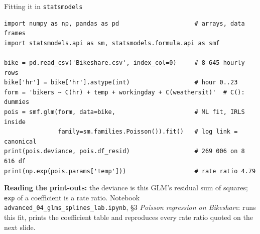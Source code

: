 \documentclass[aspectratio=169,11pt]{beamer}
\begin{document}
\begin{frame}[fragile]{Fitting it in \texttt{statsmodels}}
\begin{lstlisting}
import numpy as np, pandas as pd                     # arrays, data frames
import statsmodels.api as sm, statsmodels.formula.api as smf

bike = pd.read_csv('Bikeshare.csv', index_col=0)     # 8 645 hourly rows
bike['hr'] = bike['hr'].astype(int)                  # hour 0..23
form = 'bikers ~ C(hr) + temp + workingday + C(weathersit)'  # C(): dummies
pois = smf.glm(form, data=bike,                      # ML fit, IRLS inside
               family=sm.families.Poisson()).fit()   # log link = canonical
print(pois.deviance, pois.df_resid)                  # 269 006 on 8 616 df
print(np.exp(pois.params['temp']))                   # rate ratio 4.79
\end{lstlisting}
  \begin{labnote}
    \textbf{Reading the print-outs:} the deviance is this GLM's residual sum of
    squares; \texttt{exp} of a coefficient is a rate ratio. Notebook
    \texttt{advanced\_04\_glms\_splines\_lab.ipynb}, \S 3 \emph{Poisson
    regression on Bikeshare}: runs this fit, prints the coefficient table and
    reproduces every rate ratio quoted on the next slide.
  \end{labnote}
\end{frame}
\end{document}
